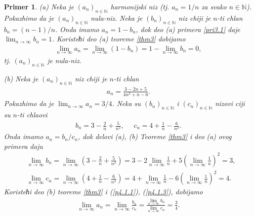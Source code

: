 \documentclass[11pt,a4paper]{article}
\newtheorem{pri}{Primer}[section]
\begin{document}
\begin{pri}
(a) Neka je $(a_n)_{n\in\mathbb{N}}$ harmonijski niz 
(tj. $a_n=1/n$ za svako $n\in\mathbb{N}$). 
Pokazhimo da je $(a_n)_{n\in\mathbb{N}}$ nula-niz. 
Neka je $(b_n)_{n\in\mathbb{N}}$ niz chiji je $n$-ti
chlan $b_n=(n-1)/n$. 
Onda imamo $a_n=1-b_n$, 
dok deo (a) primera \ref{pri3.1} daje 
$\displaystyle\lim_{n\rightarrow\infty}b_n=1$. 
Koristeћi deo (a) teoreme \ref{thm3} dobijamo 
\begin{align*}
    \lim_{n\rightarrow\infty}
    a_n=
    \lim_{n\rightarrow\infty}(1-b_n)
    =
    1-\lim_{n\rightarrow\infty}b_n
    =0, 
\end{align*}
tj. $(a_n)_{n\in\mathbb{N}}$ je nula-niz. 

(b) Neka je $(a_n)_{n\in\mathbb{N}}$ niz chiji je $n$-ti 
chlan 
\begin{align*}
    a_n=\frac{3-2n+5}{4n^2+n-6}. 
\end{align*}
Pokazhimo da je $\displaystyle\lim_{n\rightarrow\infty}a_n=3/4$. 
Neka su $(b_n)_{n\in\mathbb{N}}$ i $(c_n)_{n\in\mathbb{N}}$ 
nizovi ciji su 
$n$-ti chlaovi 
\begin{align*}
    b_n=3-\frac{2}{n}+\frac{5}{n^2}, 
    \;\;\;\;\; 
     c_n=4+\frac{1}{n}-\frac{6}{n^2}. 
\end{align*}
Onda imamo $a_n=b_n/c_n$, 
dok delovi (a), (b) Teoreme \ref{thm3} i deo (a) ovog primera daju 
\begin{align}
    &\label{p4.1.1}
    \lim_{n\rightarrow\infty} b_n
    =
    \lim_{n\rightarrow\infty}
    \left(3-\frac{2}{n}+\frac{5}{n^2} \right)
    =
    3 
    - 
    2\lim_{n\rightarrow\infty}\frac{1}{n}
    +
    5\left(\lim_{n\rightarrow\infty}\frac{1}{n} \right)^2
    =
    3, 
    \\
    &\label{p4.1.3}
    \lim_{n\rightarrow\infty} c_n
    =
    \lim_{n\rightarrow\infty}
    \left(4+\frac{1}{n}-\frac{6}{n^2} \right)
    =
    4 
    + 
    \lim_{n\rightarrow\infty}\frac{1}{n}
    -
    6\left(\lim_{n\rightarrow\infty}\frac{1}{n} \right)^2
    =
    4. 
\end{align}
Koristeћi deo (b) teoreme \ref{thm3} i (\ref{p4.1.1}), (\ref{p4.1.3}), 
dobijamo 
\begin{align*}
    \lim_{n\rightarrow\infty}
    a_n
    =
    \lim_{n\rightarrow\infty}\frac{b_n}{c_n}
    =
    \frac{\displaystyle\lim_{n\rightarrow\infty}b_n}
    {\displaystyle\lim_{n\rightarrow\infty}c_n}
    =\frac{3}{4}.  
\end{align*}
\end{pri}
\end{document}

